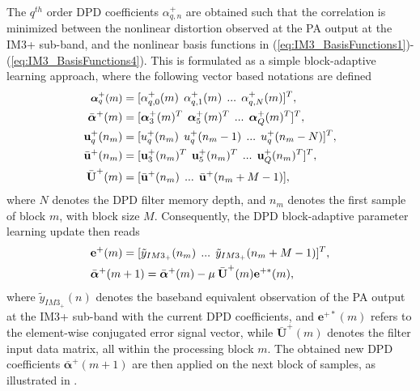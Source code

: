 The $q^{th}$ order DPD coefficients $\alpha^+_{q,n}$ are obtained such that the correlation is minimized between the nonlinear distortion observed at the PA output at the IM3+ sub-band, and the nonlinear basis functions in (\ref{eq:IM3_BasisFunctions1})-(\ref{eq:IM3_BasisFunctions4}). 
This is formulated as a simple block-adaptive learning approach, where the following vector based notations are defined
\begin{align}
\small
\boldsymbol{\alpha}^+_q(m) &= [\alpha^+_{q,0}(m)\:\:\alpha^+_{q,1}(m)\:\: ... \:\: \alpha^+_{q,N}(m)]^T, \\
\bar{\boldsymbol{\alpha}}^+(m) &= [\boldsymbol{\alpha}^+_3(m)^T \:\: \boldsymbol{\alpha}^+_5(m)^T \:\: ... \:\: \boldsymbol{\alpha}^+_Q(m)^T]^T, \\
\textbf{u}^+_q(n_m) &= [u^+_q(n_m)\:\:u^+_q(n_m-1) \:\: ... \:\: u^+_q(n_m-N)]^T, \\
\bar{\textbf{u}}^+(n_m) &= [\textbf{u}^+_3(n_m)^T \:\: \textbf{u}^+_5(n_m)^T  \:\: ... \:\: \textbf{u}^+_Q(n_m)^T ]^T, \\
\bar{\textbf{U}}^+(m) &= [\bar{\textbf{u}}^+(n_m) \:\: ... \:\: \bar{\textbf{u}}^+(n_m+M-1)],
\end{align}
\normalsize
where $N$ denotes the DPD filter memory depth, and $n_m$ denotes the first sample of block $m$, with block size $M$.
Consequently, the DPD block-adaptive parameter learning update then reads
\begin{align}
\small
&\textbf{e}^+(m) = [\tilde{y}_{IM3_+}(n_m) \:\: ... \:\: \tilde{y}_{IM3_+}(n_m+M-1)]^T, \\
&\bar{\boldsymbol{\alpha}}^+(m+1) = \bar{\boldsymbol{\alpha}}^+(m) - \mu \: \bar{\textbf{U}}^+(m)\textbf{e}^{+*}(m), 
\label{eq:BlockAdaptive}
\end{align}
\normalsize
where $\tilde{y}_{IM3_+}(n)$ denotes the baseband equivalent observation of the PA output at the IM3+ sub-band with the current DPD coefficients, and $\textbf{e}^{+*}(m)$ refers to the element-wise conjugated error signal vector, while $\bar{\textbf{U}}^+(m)$ denotes the filter input data matrix, all within the processing block $m$. 
The obtained new DPD coefficients $\bar{\boldsymbol{\alpha}}^+(m+1)$ are then applied on the next block of samples, as illustrated in \cite{Asilomar2015}.

